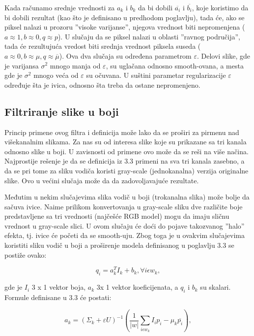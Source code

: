 \documentclass[a4paper,12pt,titlepage]{article}
\begin{document}
Kada računamo srednje vrednosti za $a_k$ i $b_k$ da bi dobili $\overline{a_i}$ i $\overline{b_i}$, koje koristimo da bi dobili rezultat (kao što je definisano u predhodom poglavlju), tada će, ako se piksel nalazi u prozoru ''visoke varijanse'', njegova vrednost biti nepromenjena ($a \approx 1, b \approx 0, q \approx p$). U slučaju da se piksel nalazi u oblasti ''ravnog područija'', tada će rezultujuća vredost biti srednja vrednost piksela suseda ($a \approx 0, b \approx \mu, q \approx \overline{\mu}$). Ova dva slučaja su određena parametrom $\varepsilon$. Delovi slike, gde je varijansa $\sigma^2$ mnogo manja od $\varepsilon$, su uglačana odnosno smooth-ovana, a mesta gde je $\sigma^2$ mnogo veća od $\varepsilon$ su očuvana. U suštini parametar regularizacije $\varepsilon$ određuje šta je ivica, odnosno šta treba da ostane nepromenjeno.   

\subsection{Filtriranje slike u boji}%

Princip primene ovog filtra i definicija može lako da se proširi za pirmenu nad višekanalnim slikama. Za nas su od interesa slike koje su prikazane sa tri kanala  odnosno slike u boji. U zavisnosti od primene ovo može da se reši na više načina. Najprostije rešenje je da se definicija iz 3.3 primeni na sva tri kanala zasebno, a da se pri tome za sliku vodiča koristi gray-scale (jednokanalna) verzija originalne slike. Ovo u većini slučaja može da da zadovoljavajuće rezultate. 

Međutim u nekim slučajevima slika vodič u boji (trokanalna slika) može bolje da sačuva ivice. Naime prilikom konvertovanja u gray-scale sliku dve različite boje predstavljene sa tri vrednosti (najčešće RGB model) mogu da imaju sličnu vrednost u gray-scale slici. U ovom slučaju će doći do pojave takozvanog ''halo'' efekta, tj. ivice će početi da se smooth-uju. Zbog toga je u ovakvim slučajevima koristiti sliku vodič u boji a proširenje modela definisanog u poglavlju 3.3 se postiže ovako:

\begin{equation}\label{gf10}
	q_i = a_k^T I_k + b_k, \forall i \epsilon w_k,
\end{equation}   

gde je $I_i$ 3 x 1 vektor boja, $a_k$ 3x 1 vektor koeficijenata, a $q_i$ i $b_k$ su skalari. Formule definisane u 3.3 će postati:

\begin{equation}\label{eq:gf11}
	a_k = (\Sigma_k + \varepsilon U)^{-1} (\dfrac{1}{|w|} \sum_{i \epsilon w_k} I_i p_i - \mu_k \overline{p_i}),
\end{equation}
\end{document}
